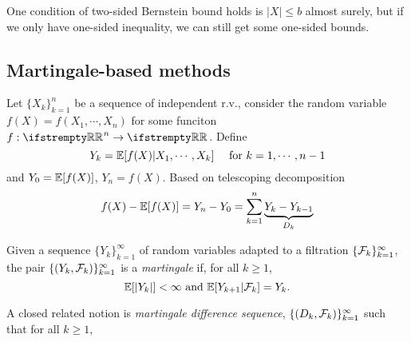 \documentclass{paper}
\begin{document}
One condition of two-sided Bernstein bound holds is $\vert X\vert \leq b$ almost surely, but if we only have one-sided inequality, we can still get some one-sided bounds.

\subsection{Martingale-based methods}
Let $\{X_k\}_{k=1}^n$ be a sequence of independent r.v., consider the random variable $f(X)=f(X_1, \cdots , X_n)$ for some funciton $f:\RR^n\to \RR$.
Define
\[
	Y_k = \mathbb{E}[f(X)\vert X_1, \cdots, X_k]\quad \text{ for } k=1,\cdots, n-1
\]
and $Y_0 = \mathbb{E}[f(X)]$, $Y_n=f(X)$. Based on telescoping decomposition
\[
	f(X)-\mathbb{E}[f(X)] = Y_n-Y_0 =\sum_{k=1}^n\underbrace{Y_k-Y_{k-1}}_{D_k}
\]
\begin{defn}
	Given a sequence $\{Y_k\}_{k=1}^\infty$ of random variables adapted to a filtration $\{\mathcal{F}_k\}_{k=1}^\infty$, the pair $\{(Y_k, \mathcal{F}_k)\}_{k=1}^\infty$ is a \textit{martingale} if, for all $k\geq 1$,
	\[
		\mathbb{E}[\vert Y_k\vert]< \infty \text{ and } \mathbb{E}[Y_{k+1}\vert \mathcal{F}_k] = Y_k.
	\]
\end{defn}
A closed related notion is \textit{martingale difference sequence}, $\{(D_k, \mathcal{F}_k)\}_{k=1}^\infty$ such that for all $k\geq 1$,
\printbibliography
\end{document}
